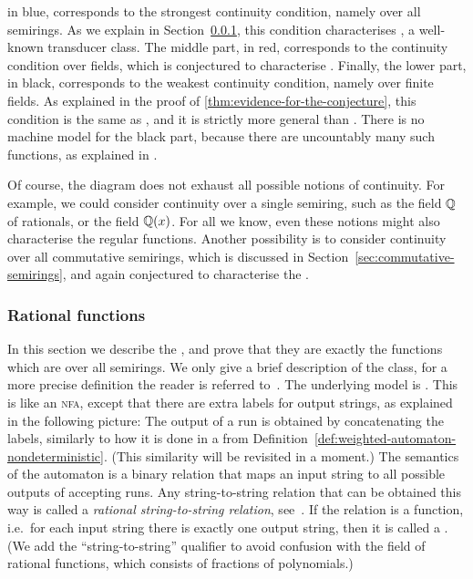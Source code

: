 in blue, corresponds to the strongest continuity condition, namely over all
semirings. As we explain in Section~\ref{sec:rational-functions}, this
condition characterises , a well-known transducer class.
The middle part, in red, corresponds to the continuity condition over fields,
which is conjectured to characterise . Finally, the lower
part, in black, corresponds to the weakest continuity condition, namely over
finite fields. As explained in the proof of
\cref{thm:evidence-for-the-conjecture}, this condition is the same as
, and it is strictly more general than
. There is no machine model for the black part,
because there are uncountably many such functions, as explained in
\cite{bojanczykTitoRegular23}.

Of course, the diagram does not exhaust all possible notions of continuity. For
example, we could consider continuity over a single semiring, such as the field
${\mathbb Q}$ of rationals, or the field ${\mathbb Q}(x)$. For all we know, even these
notions might also characterise the regular functions. Another possibility is
to consider continuity over all commutative semirings, which is discussed in
Section~\ref{sec:commutative-semirings}, and again conjectured to characterise
the .

\subsubsection{Rational functions}
\label{sec:rational-functions}
\AP
In this section we describe the , and
prove that they are exactly the functions which are  over all
semirings.  We only give a brief description of the class, for a more precise
definition the reader is referred to~\cite[Section
14.2]{bojanczyk_automata_2025}. The underlying model is . This is like an \textsc{nfa}, except
that there are extra labels for output strings, as  explained in the following
picture: 
The output of a run is obtained by concatenating the labels, similarly to how
it is done in a  from
Definition~\ref{def:weighted-automaton-nondeterministic}. (This similarity will
be revisited in a moment.) The semantics of the automaton is a binary relation
that maps an input string to all possible outputs of accepting runs. Any
string-to-string relation that can be obtained this way is called a
\emph{rational string-to-string relation}, see~\cite[Chapter IX]{Eilenberg74}.
If the relation is a function, i.e.~for each input string there is exactly one
output string, then it is called a .
(We add the ``string-to-string'' qualifier to avoid confusion with the field
of rational functions, which consists of fractions of polynomials.)  

